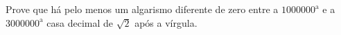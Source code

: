 Prove que há pelo menos um algarismo diferente de zero entre a $1000000^\mathrm{a}$ e a $3000000^\mathrm{a}$ casa decimal de $\sqrt{2}$ após a vírgula.